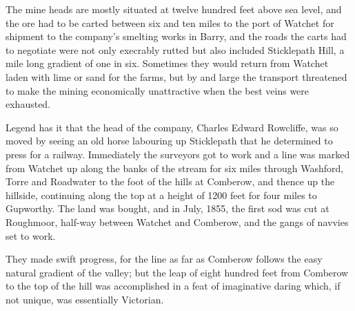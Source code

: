 The mine heads are mostly situated at twelve hundred feet above sea level, and the ore had to be carted between six and ten miles to the port of Watchet for shipment to the company’s smelting works in Barry, and the roads the carts had to negotiate were not only execrably rutted but also included Sticklepath Hill, a mile long gradient of one in six. Sometimes they would return from Watchet laden with lime or sand for the farms, but by and large the transport threatened to make the mining economically unattractive when the best veins were exhausted.

Legend has it that the head of the company, Charles Edward Rowcliffe, was so moved by seeing an old horse labouring up Sticklepath that he determined to press for a railway. Immediately the surveyors got to work and a line was marked from Watchet up along the banks of the stream for six miles through Washford, Torre and Roadwater to the foot of the hills at Comberow, and thence up the hillside, continuing along the top at a height of 1200 feet for four miles to Gupworthy. The land was bought, and in July, 1855, the first sod was cut at Roughmoor, half-way between Watchet and Comberow, and the gangs of navvies set to work. 

They made swift progress, for the line as far as Comberow follows the easy natural gradient of the valley; but the leap of eight hundred feet from Comberow to the top of the hill was accomplished in a feat of imaginative daring which, if not unique, was essentially Victorian.

